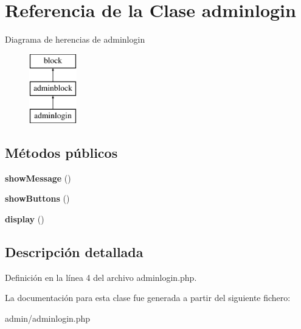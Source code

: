 \hypertarget{classadminlogin}{\section{\-Referencia de la \-Clase adminlogin}
\label{classadminlogin}
}
\-Diagrama de herencias de adminlogin\begin{figure}[H]
\begin{center}
\leavevmode
\includegraphics[height=3.000000cm]{classadminlogin}
\end{center}
\end{figure}
\subsection*{\-Métodos públicos}
\begin{DoxyCompactItemize}
\item 
\hypertarget{classadminlogin_a9413fd10c23ace3cca43c2a4919b5941}{{\bfseries show\-Message} ()}\label{classadminlogin_a9413fd10c23ace3cca43c2a4919b5941}

\item 
\hypertarget{classadminlogin_a0b0d46370f41b7d49727d69d404f7eb3}{{\bfseries show\-Buttons} ()}\label{classadminlogin_a0b0d46370f41b7d49727d69d404f7eb3}

\item 
\hypertarget{classadminlogin_a7133dff5753a8101111b6e3d4e2d6959}{{\bfseries display} ()}\label{classadminlogin_a7133dff5753a8101111b6e3d4e2d6959}

\end{DoxyCompactItemize}


\subsection{\-Descripción detallada}


\-Definición en la línea 4 del archivo adminlogin.\-php.



\-La documentación para esta clase fue generada a partir del siguiente fichero\-:\begin{DoxyCompactItemize}
\item 
admin/adminlogin.\-php\end{DoxyCompactItemize}
